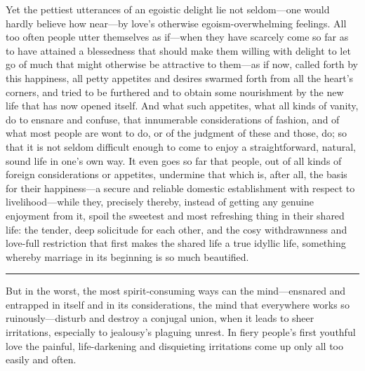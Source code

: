 \documentclass[12pt,a4paper]{book}
\begin{document}
Yet the pettiest utterances of an egoistic delight lie not seldom---one
would hardly believe how near---by love's otherwise egoism-overwhelming
feelings. All too often people utter themselves as if---when they have
scarcely come so far as to have attained a blessedness that should make
them willing with delight to let go of much that might otherwise be
attractive to them---as if now, called forth by this happiness, all petty
appetites and desires swarmed forth from all the heart's corners, and tried
to be furthered and to obtain some nourishment by the new life that has now
opened itself. And what such appetites, what all kinds of vanity, do to
ensnare and confuse, that innumerable considerations of fashion, and of
what most people are wont to do, or of the judgment of these and those, do;
so that it is not seldom difficult enough to come to enjoy a
straightforward, natural, sound life in one's own way. It even goes so far
that people, out of all kinds of foreign considerations or appetites,
undermine that which is, after all, the basis for their happiness---a secure
and reliable domestic establishment with respect to livelihood---while they,
precisely thereby, instead of getting any genuine enjoyment from it, spoil
the sweetest and most refreshing thing in their shared life: the tender,
deep solicitude for each other, and the cosy withdrawnness and love-full
restriction that first makes the shared life a true idyllic life, something
whereby marriage in its beginning is so much beautified.
\begin{center}\rule{0.28\linewidth}{0.4pt}\end{center}

But in the worst, the most spirit-consuming ways can the mind---ensnared
and entrapped in itself and in its considerations, the mind that everywhere
works so ruinously---disturb and destroy a conjugal union, when it leads to
sheer irritations, especially to jealousy's plaguing unrest. In fiery
people's first youthful love the painful, life-darkening and disquieting
irritations come up only all too easily and often.
\end{document}
